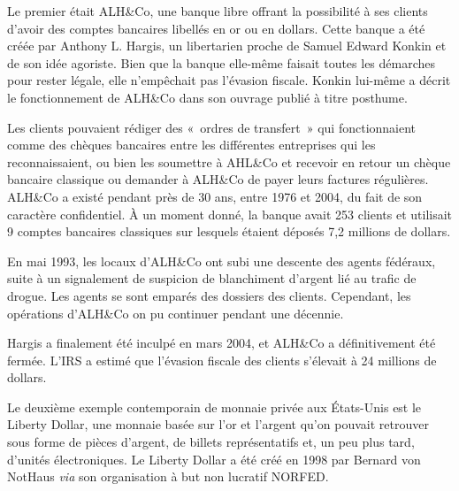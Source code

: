 
Le premier était ALH\&Co, une banque libre offrant la possibilité à ses clients d'avoir des comptes bancaires libellés en or ou en dollars. Cette banque a été créée par Anthony L. Hargis, un libertarien proche de Samuel Edward Konkin et de son idée agoriste. Bien que la banque elle-même faisait toutes les démarches pour rester légale, elle n'empêchait pas l'évasion fiscale. Konkin lui-même a décrit le fonctionnement de ALH\&Co dans son ouvrage  publié à titre posthume.

Les clients pouvaient rédiger des «~ordres de transfert~» qui fonctionnaient comme des chèques bancaires entre les différentes entreprises qui les reconnaissaient, ou bien les soumettre à AHL\&Co et recevoir en retour un chèque bancaire classique ou demander à ALH\&Co de payer leurs factures régulières. ALH\&Co a existé pendant près de 30 ans, entre 1976 et 2004, du fait de son caractère confidentiel. À un moment donné, la banque avait 253 clients et utilisait 9 comptes bancaires classiques sur lesquels étaient déposés 7,2 millions de dollars.

En mai 1993, les locaux d'ALH\&Co ont subi une descente des agents fédéraux, suite à un signalement de suspicion de blanchiment d'argent lié au trafic de drogue. Les agents se sont emparés des dossiers des clients. Cependant, les opérations d'ALH\&Co on pu continuer pendant une décennie.

Hargis a finalement été inculpé en mars 2004, et ALH\&Co a définitivement été fermée. L'IRS a estimé que l'évasion fiscale des clients s'élevait à 24 millions de dollars.


Le deuxième exemple contemporain de monnaie privée aux États-Unis est le Liberty Dollar, une monnaie basée sur l'or et l'argent qu'on pouvait retrouver sous forme de pièces d'argent, de billets représentatifs et, un peu plus tard, d'unités électroniques. Le Liberty Dollar a été créé en 1998 par Bernard von NotHaus \emph{via} son organisation à but non lucratif NORFED.

